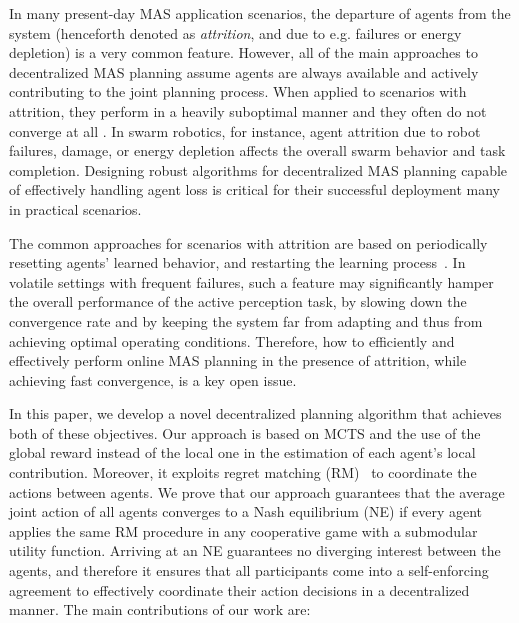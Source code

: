 In many present-day MAS application scenarios, the departure of agents from the system (henceforth denoted as \textit{attrition}, and due to e.g. failures or energy depletion) is a very common feature. However, all of the main approaches to decentralized MAS planning assume agents are always available and actively contributing to the joint planning process. When applied to scenarios with attrition, they perform in a heavily suboptimal manner and they often do not converge at all \citep{cybenko2021attritable,nguyen2022multi}. In swarm robotics, for instance, agent attrition due to robot failures, damage, or energy depletion affects the overall swarm behavior and task completion. Designing robust algorithms for decentralized MAS planning capable of effectively handling agent loss is critical for their successful deployment many in practical scenarios.

The common approaches for scenarios with attrition are based on periodically resetting agents' learned behavior, and restarting the learning process~\citep {avner2014concurrent,rosenski2016multi,hanawal2021multiplayer}. In volatile settings with frequent failures, such a feature may significantly hamper the overall performance of the active perception task, by slowing down the convergence rate and by keeping the system far from adapting and thus from achieving optimal operating conditions. 
Therefore, how to efficiently and effectively perform online MAS planning in the presence of attrition, while achieving fast convergence, is a key open issue.

In this paper, we develop a novel decentralized planning algorithm that achieves both of these objectives. Our approach is based on MCTS and the use of the global reward instead of the local one in the estimation of each agent's local contribution. Moreover, it exploits regret matching (RM)~\citep{hart2000simple} to coordinate the actions between agents. We prove that our approach guarantees that the average joint action of all agents converges to a Nash equilibrium (NE) if every agent applies the same RM procedure in any cooperative game with a submodular utility function. Arriving at an NE guarantees no diverging interest between the agents, and therefore it ensures that all participants come into a self-enforcing agreement to effectively coordinate their action decisions in a decentralized manner.
The main contributions of our work are:

